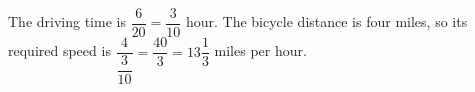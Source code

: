 The driving time is $\dfrac{6}{20}=\dfrac{3}{10}$ hour. The bicycle distance is four miles, so its required speed is $\dfrac{4}{\dfrac{3}{10}}=\dfrac{40}{3}=\boxed{13\dfrac{1}{3}}$ miles per hour.
